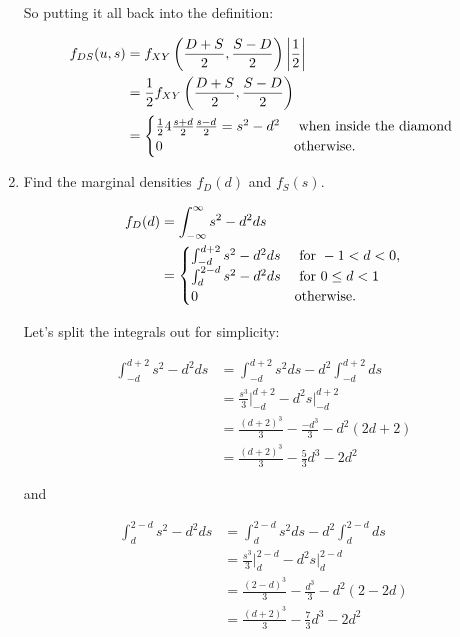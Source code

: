 \documentclass{article}
\newcommand{\1}{\mathbf{1}}
\begin{document}
\begin{enumerate}
    So putting it all back into the definition:
    
    \begin{align*}
     f_{DS}(u,s) &= f_{XY}\left(\frac{D + S}{2}, \frac{S - D}{2}\right) \bigg|\frac{1}{2}\bigg| \\
     &= \frac{1}{2} f_{XY}\left(\frac{D + S}{2}, \frac{S - D}{2}\right) \\
     &= \begin{cases}
        \frac{1}{2} 4\frac{s+d}{2}\frac{s-d}{2} = s^2-d^2 & \hbox{ when inside the diamond } \\ 
        0 & \hbox{otherwise.}
        \end{cases}
    \end{align*}

    \newpage
    \item Find the marginal densities $f_D(d)$ and $f_S(s)$.
    
    \begin{align*}
    f_{D}(d) &= \int_{-\infty}^\infty s^2 - d^2 ds \\
    &= \begin{cases}
       \int_{-d}^{d+2} s^2 - d^2 ds &\hbox{ for } -1 < d < 0, \\
       \int_{d}^{2-d} s^2 - d^2 ds  &\hbox{ for } 0\leq d < 1 \\
       0 &\hbox{otherwise.}
       \end{cases}
    \end{align*}
    
    Let's split the integrals out for simplicity:

    \begin{align*}
        \int_{-d}^{d+2} s^2 - d^2 ds &=  \int_{-d}^{d+2} s^2 ds -  d^2\int_{-d}^{d+2} ds \\
        &= \frac{s^3}{3}\bigg |_{-d}^{d+2} - d^2 s|_{-d}^{d+2} \\
        &= \frac{(d+2)^3}{3} - \frac{-d^3}{3} - d^2(2d+2) \\
        &= \frac{(d+2)^3}{3} - \frac{5}{3} d^3 - 2d^2
    \end{align*}
    
    and
    
    \begin{align*}
        \int_{d}^{2-d} s^2 - d^2 ds &=  \int_{d}^{2-d} s^2 ds -  d^2\int_{d}^{2-d} ds \\
        &= \frac{s^3}{3}\bigg |_{d}^{2-d} - d^2 s|_{d}^{2-d} \\
        &= \frac{(2-d)^3}{3} - \frac{d^3}{3} - d^2(2-2d) \\
        &= \frac{(d+2)^3}{3} - \frac{7}{3} d^3 - 2d^2 
    \end{align*}
    

\end{enumerate}
\end{document}
